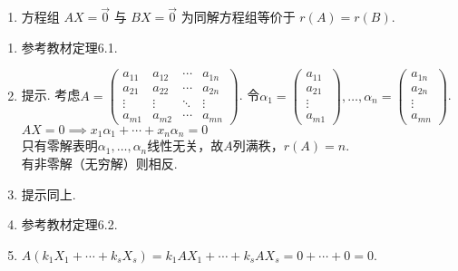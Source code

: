 \begin{exercise}
\begin{exgroup}
\begin{enumerate}[resume*]
            \item 方程组 $AX=\vec{0}$ 与 $BX=\vec{0}$ 为同解方程组等价于 $r(A)=r(B)$.
        \end{enumerate}
        \begin{answer}
            \begin{enumerate}
                \item 参考教材定理6.1.

                \item 提示. 考虑$A=\begin{pmatrix}
                              a_{11} & a_{12} & \cdots & a_{1n} \\
                              a_{21} & a_{22} & \cdots & a_{2n} \\
                              \vdots & \vdots & \ddots & \vdots \\
                              a_{m1} & a_{m2} & \cdots & a_{mn}
                          \end{pmatrix}$. 令$\alpha_1=\begin{pmatrix}
                              a_{11} \\
                              a_{21} \\
                              \vdots \\
                              a_{m1}
                          \end{pmatrix},\ldots,\alpha_n=\begin{pmatrix}
                              a_{1n} \\
                              a_{2n} \\
                              \vdots \\
                              a_{mn}
                          \end{pmatrix}$. $AX=0\implies x_1\alpha_1+\cdots+x_n\alpha_n=0$\\
                      只有零解表明$\alpha_1,\ldots,\alpha_n$线性无关，故$A$列满秩，$r(A)=n$.\\
                      有非零解（无穷解）则相反.

                \item 提示同上.

                \item 参考教材定理6.2.

                \item $A(k_1X_1+\cdots+k_sX_s)=k_1AX_1+\cdots+k_sAX_s=0+\cdots+0=0$.


\end{enumerate}
\end{answer}
\end{exgroup}
\end{exercise}
